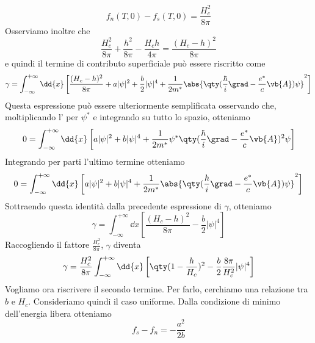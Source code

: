 \begin{equation*}
   f_n(T,0)-f_s(T,0)=\frac{H_c^2}{8\pi}
\end{equation*}
Osserviamo inoltre che
\begin{equation*}
   \frac{H_c^2}{8\pi}
   +
   \frac{h^2}{8\pi}
   -
   \frac{H_c h}{4\pi}
   =
   \frac{(H_c-h)^2}{8\pi}
\end{equation*}
e quindi il termine di contributo superficiale può essere riscritto come
\begin{equation*}
   \gamma
   =
   \int_{-\infty}^{+\infty}\dd{x}
   \left[
      \frac{(H_c-h)^2}{8\pi}
      +
      a|\psi|^2
      +
      \frac{b}{2}|\psi|^4
      +
      \frac{1}{2m^*}
      \abs{
         \qty(
            \frac{\hbar}{i}\grad
            -
            \frac{e^*}{c}\vb{A}
         )\psi
      }^2
   \right]
\end{equation*}
Questa espressione può essere ulteriormente semplificata osservando che, moltiplicando l' per $\psi^*$ e integrando su tutto lo spazio, otteniamo
\begin{equation*}
   0
   =
   \int_{-\infty}^{+\infty}\dd{x}
   \left[
      a|\psi|^2
      +
      b|\psi|^4
      +
      \frac{1}{2m^*}
      \psi^*
      \qty(
         \frac{\hbar}{i}\grad
         -
         \frac{e^*}{c}\vb{A}
      )^2
      \psi
   \right]
\end{equation*}
Integrando per parti l'ultimo termine otteniamo
\begin{equation*}
   0 = \int_{-\infty}^{+\infty}\dd{x} \left[ a|\psi|^2 + b|\psi|^4 + \frac{1}{2m^*} \abs{ \qty( \frac{\hbar}{i}\grad - \frac{e^*}{c}\vb{A} )\psi }^2 \right]
\end{equation*}
Sottraendo questa identità dalla precedente espressione di $\gamma$, otteniamo
\begin{equation*}
   \gamma = \int_{-\infty}^{+\infty}\dd{x} \left[ \frac{(H_c-h)^2}{8\pi} - \frac{b}{2}|\psi|^4 \right]
\end{equation*}
Raccogliendo il fattore $\frac{H_c^2}{8\pi}$, $\gamma$ diventa
\begin{equation*}
   \gamma = \frac{H_c^2}{8\pi} \int_{-\infty}^{+\infty}\dd{x} \left[ \qty( 1-\frac{h}{H_c} )^2 - \frac{b}{2}\frac{8\pi}{H_c^2}|\psi|^4 \right]
\end{equation*}
Vogliamo ora riscrivere il secondo termine. Per farlo, cerchiamo una relazione tra $b$ e $H_c$. Consideriamo quindi il caso uniforme. Dalla condizione di minimo dell'energia libera otteniamo
\begin{equation*}
   f_s-f_n=-\frac{a^2}{2b}
\end{equation*}
